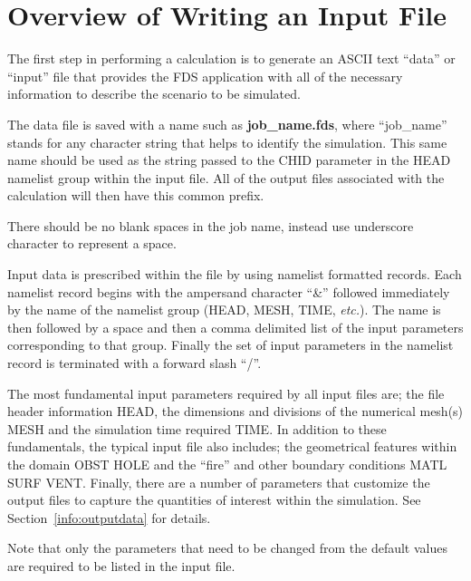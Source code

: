 \documentclass[11pt]{book}
\begin{document}
\section{Overview of Writing an Input File}
\label{info:inputfilecreation}
The first step in performing a calculation is to generate an ASCII text ``data'' or ``input'' file
that provides the FDS application with all of the necessary information to
describe the scenario to be simulated.

The data file is saved with a name such as {\bf job\_name.fds},
where ``job\_name'' stands for any character string that helps to identify
the simulation. This same name should be used as the string passed to the
CHID parameter in the HEAD namelist group within the input file. All of the
output files associated with the calculation will then have this common prefix.

\begin{warning}
\noindent
There should be no blank spaces in the job name, instead use underscore
character to represent a space.
\end{warning}

Input data is prescribed within the file by using namelist formatted records.
Each namelist record begins with the ampersand character ``{\ct \&}'' followed
immediately by the name of the namelist group ({\ct HEAD, MESH, TIME}, {\em etc.}).
The name is then followed by a space and then a comma delimited list of the input parameters
corresponding to that group. Finally the set of input parameters in the namelist record is
terminated with a forward slash ``{\ct /}''.

The most fundamental input parameters required by all input files are;
the file header information {\ct HEAD}, the dimensions and divisions of
the numerical mesh(s) {\ct MESH} and the simulation time required {\ct TIME}.
In addition to these fundamentals, the typical input file also includes;
the geometrical features within the domain {\ct OBST} {\ct HOLE} and
the ``fire'' and other boundary conditions {\ct MATL} {\ct SURF} {\ct VENT}.
Finally, there are a number of parameters that customize the output
files to capture the quantities of interest within the simulation.
See Section~\ref{info:outputdata} for details.

\begin{warning}
\noindent
Note that only the parameters that need to be changed from the default values
are required to be listed in the input file.
\end{warning}
\end{document}
